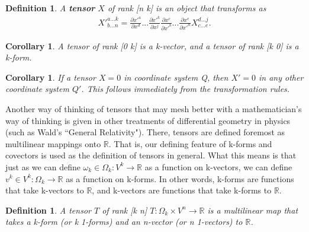 \documentclass{book}
\newtheorem{defn}[equation]{Definition}
\newtheorem{coro}[equation]{Corollary}
\begin{document}
\begin{defn}
	A \textbf{tensor} $X$ of rank [n k] is an object that transforms as \begin{gather}X'^{a...k}_{b...n} = \frac{\partial x'^a}{\partial x^d} ... \frac{\partial x'^k}{\partial x^j} \frac{\partial x^c}{\partial x'^b} ... \frac{\partial x^e}{\partial x'^n} X^{d...j}_{c...e}.\end{gather} 
\end{defn}

\begin{coro}
	A tensor of rank [0 k] is a k-vector, and a tensor of rank [k 0] is a k-form. 
\end{coro}



\begin{coro}
	If a tensor $X = 0$ in coordinate system Q, then $X' = 0$ in any other coordinate system $Q'$. This follows immediately from the transformation rules. 
\end{coro}


Another way of thinking of tensors that may mesh better with a mathematician's way of thinking is given in other treatments of differential geometry in physics (such as Wald's ``General Relativity"). There, tensors are defined foremost as multilinear mappings onto $\mathbb{R}$. That is, our defining feature of k-forms and covectors is used as the definition of tensors in general. What this means is that just as we can define $\omega_k \in \Omega_k : V^k \to \mathbb{R}$ as a function on k-vectors, we can define $v^k \in V^k : \Omega_k \to \mathbb{R}$ as a function on k-forms. In other words, k-forms are functions that take k-vectors to $\mathbb{R}$, and k-vectors are functions that take k-forms to $\mathbb{R}$. 

\begin{defn}
	A tensor $T$ of rank [k n] $T: \Omega_k \times V^n \to \mathbb{R}$ is a multilinear map that takes a k-form (or k 1-forms) and an n-vector (or n 1-vectors) to $\mathbb{R}$. 
\end{defn}
\end{document}
